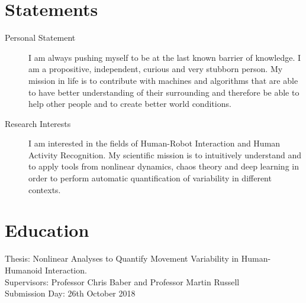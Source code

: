\documentclass[10pt,a4paper,roman]{moderncv}
\begin{document}
\section{Statements}

\begin{changemargin}{2.4cm}{0.5cm}

\begin{description}
\item [Personal Statement] 
I am always pushing myself to be at the last known barrier of knowledge.
I am a propositive, independent, curious and very stubborn person.
My mission in life is to contribute with machines and algorithms 
that are able to have better understanding of their surrounding and 
therefore be able to help other people and to create better world conditions.

\item [Research Interests]
I am interested in the fields of Human-Robot Interaction and Human Activity Recognition.
My scientific mission is to intuitively understand and to apply tools from nonlinear dynamics, 
chaos theory and deep learning in order to perform automatic quantification of variability in 
different contexts.
\end{description}

\end{changemargin}



\section{Education}
  {Thesis: Nonlinear  Analyses to Quantify Movement Variability in Human-Humanoid Interaction.
 \href{https://doi.org/10.5281/zenodo.1473140}{\faFilePdfO}
 \href{https://github.com/mxochicale/phd-thesis}{\faGithubAlt}
 \href{https://github.com/mxochicale/phd-thesis-code-data}{\faCode}
	\\ Supervisors: Professor Chris Baber and  Professor Martin Russell  
	\\ Submission Day: 26th October 2018	
}
\end{document}
